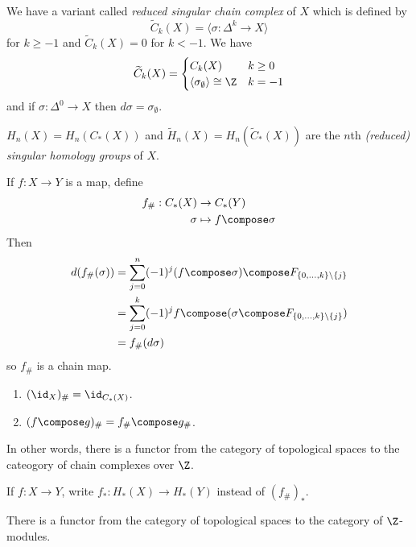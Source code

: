 \documentclass[a4paper]{article}
\begin{document}
We have a variant called \emph{reduced singular chain complex} of \(X\) which is defined by
\[
  \widetilde C_k(X) = \langle \sigma: \Delta^k \to X \rangle
\] 
for \(k \geq -1\) and \(\widetilde C_k(X) = 0\) for \(k < -1\). We have
\[
  \widetilde C_k(X) =
  \begin{cases}
    C_k(X) & k \geq 0 \\
    \langle \sigma_\emptyset \rangle \cong \Z & k = -1
  \end{cases}
\]
and if \(\sigma: \Delta^0 \to X\) then \(d\sigma = \sigma_\emptyset\).

\begin{definition}
  \(H_n(X) = H_n(C_*(X))\) and \(\widetilde H_n(X) = H_n(\widetilde C_*(X))\) are the \(n\)th \emph{(reduced) singular homology groups} of \(X\).
\end{definition}

If \(f: X \to Y\) is a map, define
\begin{align*}
  f_\#: C_*(X) &\to C_*(Y) \\
  \sigma &\mapsto f \compose \sigma
\end{align*}
Then
\begin{align*}
  d(f_\#(\sigma)) &= \sum_{j = 0}^n (-1)^j (f \compose \sigma) \compose F_{\{0, \dots, k\} \setminus \{j\}} \\
  &= \sum_{j = 0}^k (-1)^j f \compose (\sigma \compose F_{\{0, \dots, k\} \setminus \{j\}}) \\
  &= f_\# (d \sigma)
\end{align*}
so \(f_\#\) is a chain map.

\begin{lemma}\leavevmode
  \begin{enumerate}
  \item \((\id_X)_\# = \id_{C_*(X)}\).
  \item \((f \compose g)_\# = f_\# \compose g_\#\).
  \end{enumerate}
  In other words, there is a functor from the category of topological spaces to the cateogory of chain complexes over \(\Z\).
\end{lemma}

\begin{notation}
  If \(f: X \to Y\), write \(f_*: H_*(X) \to H_*(Y)\) instead of \((f_\#)_*\).
\end{notation}

\begin{corollary}
  There is a functor from the category of topological spaces to the category of \(\Z\)-modules.
\end{corollary}
\end{document}
